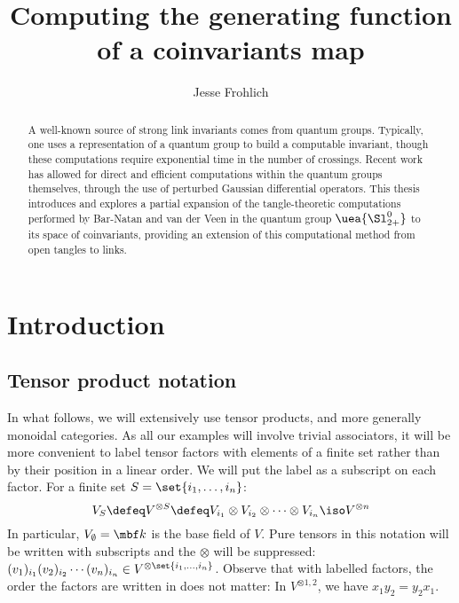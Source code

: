 \documentclass{article}
\title{Computing the generating function of a coinvariants map}
\author{Jesse Frohlich}
\begin{document}
\maketitle

\begin{abstract}
        A well-known source of strong link invariants comes from quantum groups.
        Typically, one uses a representation of a quantum group to build a
        computable invariant, though these computations require exponential time
        in the number of crossings. Recent work has allowed for direct and
        efficient computations within the quantum groups themselves, through the
        use of perturbed Gaussian differential operators. This thesis introduces
        and explores a partial expansion of the tangle-theoretic computations
        performed by Bar-Natan and van der Veen \cite{BV} in the quantum group
        $\uea{\Sl_{2+}^0}$ to its space of coinvariants, providing an extension
        of this computational method from open tangles to links.

\end{abstract}

\newpage

\tableofcontents

\section{Introduction}

\subsection{Tensor product notation}
In what follows, we will extensively use tensor products, and more generally
monoidal categories. As all our examples will involve trivial associators, it
will be more convenient to label tensor factors with elements of a finite set
rather than by their position in a linear order. We will put the label as a
subscript on each factor. For a finite set $S = \set{i_1, \dots, i_n}$:
\begin{equation}
        V_S \defeq
        V^{\otimes S} \defeq
        V_{i_1}\otimes V_{i_2}\otimes\dots\otimes V_{{i_n}} \iso V^{\otimes n}
\end{equation}
In particular, $V_{\emptyset} = \k$ is the base field of $V$.
Pure tensors in this notation will be written with subscripts and the $\otimes$
will be suppressed:
$(v_1)_{i_1}(v_2)_{i_2}\cdots(v_n)_{i_n} \in V^{\otimes\set{i_1,\dots,i_n}}$.
Observe that with labelled factors, the order the factors are written in does
not matter: In $V^{\otimes{1,2}}$, we have $x_1y_2 = y_2x_1$.
\end{document}
